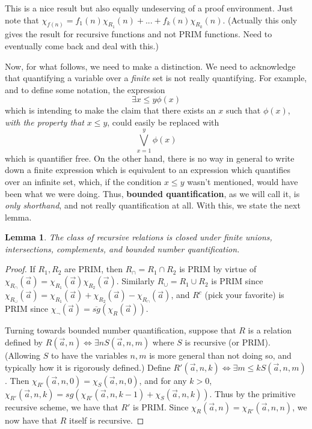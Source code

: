 \documentclass{article}
\theoremstyle{definition}
\theoremstyle{plain}
\theoremstyle{theorem}
\newtheorem{lemma}{Lemma}[section]
\begin{document}
This is a nice result but also equally undeserving of a proof environment. Just note that $\chi_{f(n)} = f_1(n)\chi_{R_1}(n) + ... + f_k(n)\chi_{R_k}(n)$. (Actually this only gives the result for recursive functions and not PRIM functions. Need to eventually come back and deal with this.)
\par Now, for what follows, we need to make a distinction. We need to acknowledge that quantifying a variable over a \textit{finite} set is not really quantifying. For example, and to define some notation, the expression 
\[ \exists x \leq y \phi(x)  \]
which is intending to make the claim that there exists an $x$ such that $\phi(x)$, \textit{with the property that} $x \leq y$, could easily be replaced with
\[ \bigvee_{x = 1}^y \phi(x) \]
which is quantifier free. On the other hand, there is no way in general to write down a finite expression which is equivalent to an expression which quantifies over an infinite set, which, if the condition $x \leq y$ wasn't mentioned, would have been what we were doing. Thus, \textbf{bounded quantification}, as we will call it, is \textit{only shorthand}, and not really quantification at all. With this, we state the next lemma.
\begin{lemma}
    The class of recursive relations is closed under finite unions, intersections, complements, and bounded number quantification.
\end{lemma}
\begin{proof}
    If $R_1,R_2$ are PRIM, then $R_{\cap} = R_1 \cap R_2$ is PRIM by virtue of $\chi_{R_{\cap}}(\vec{a}) = \chi_{R_1}(\vec{a})\chi_{R_2}(\vec{a})$. Similarly $R_{\cup} = R_1 \cup R_2$ is PRIM since $\chi_{R_{\cup}}(\vec{a}) = \chi_{R_1}(\vec{a}) + \chi_{R_2}(\vec{a}) - \chi_{R_{\cap}}(\vec{a})$, and $R^c$ (pick your favorite) is PRIM since $\chi_{\neg}(\vec{a}) = \overline{sg}(\chi_R(\vec{a}))$. 
    \par Turning towards bounded number quantification, suppose that $R$ is a relation defined by $R(\vec{a},n) \iff \exists n S(\vec{a},n,m)$ where $S$ is recursive (or PRIM). (Allowing $S$ to have the variables $n,m$ is more general than not doing so, and typically how it is rigorously defined.) Define $R'(\vec{a},n,k) \iff \exists m \leq k S(\vec{a},n,m)$. Then $\chi_{R'}(\vec{a},n,0) = \chi_S(\vec{a},n,0)$, and for any $k > 0$, $\chi_{R'}(\vec{a},n,k) = sg(\chi_{R'}(\vec{a},n,k-1)+\chi_S(\vec{a},n,k))$. Thus by the primitive recursive scheme, we have that $R'$ is PRIM. Since $\chi_R(\vec{a},n) = \chi_{R'}(\vec{a},n,n)$, we now have that $R$ itself is recursive. 
\end{proof}
\end{document}
